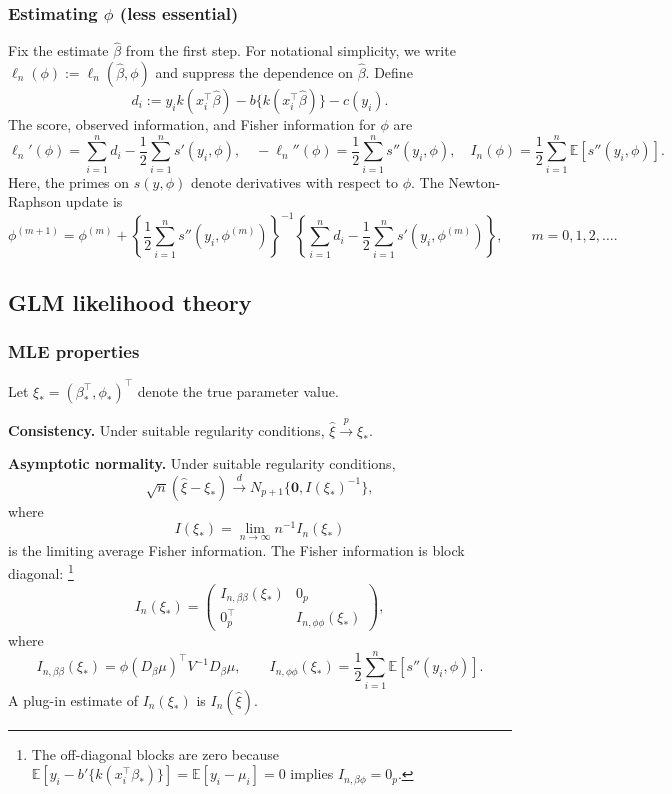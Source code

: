 \documentclass{article}
\theoremstyle{break}
\newcommand{\E}{\ensuremath{\mathbb{E}}}
\begin{document}
\subsubsection{Estimating $\phi$ (less essential)}
Fix the estimate $\hat\beta$ from the first step. 
For notational simplicity, we write $\ell_n(\phi):=\ell_n(\hat\beta,\phi)$ and suppress the dependence on $\hat\beta$. Define
\[
  d_i
  :=y_i k(x_i^\top\hat\beta)
  -b\{k(x_i^\top\hat\beta)\}
  -c(y_i).
\]
The score, observed information, and Fisher information for $\phi$ are
\[
  \ell_n'(\phi)
  =\sum_{i=1}^n d_i
  -\frac{1}{2}\sum_{i=1}^n s'(y_i,\phi), \quad
  -\ell_n''(\phi)
  =\frac{1}{2}\sum_{i=1}^n s''(y_i,\phi), \quad
  I_n(\phi)
  =\frac{1}{2}\sum_{i=1}^n
  \E[s''(y_i,\phi)].
\]
Here, the primes on $s(y,\phi)$ denote derivatives with respect to $\phi$. The Newton-Raphson update is
\[
  \phi^{(m+1)}
  =\phi^{(m)}
  +\left\{\frac{1}{2}\sum_{i=1}^n
  s''(y_i,\phi^{(m)})\right\}^{-1}
  \left\{\sum_{i=1}^n d_i
  -\frac{1}{2}\sum_{i=1}^n s'(y_i,\phi^{(m)})\right\},
  \qquad m=0,1,2,\ldots.
\]


\subsection{GLM likelihood theory}\label{sec:glm-likelihood-theory}
\subsubsection{MLE properties}
Let $\xi_*=(\beta_*^\top,\phi_*)^\top$ denote the true parameter value.

\textbf{Consistency.} Under suitable regularity conditions, $\hat\xi \stackrel{p}{\to} \xi_*$.

\textbf{Asymptotic normality.} Under suitable regularity conditions,
\[
  \sqrt{n}(\hat\xi-\xi_*)
  \xrightarrow{d}
  N_{p+1}\{\mathbf{0},I(\xi_*)^{-1}\},
\]
where
\[
  I(\xi_*)=\lim_{n\to\infty}n^{-1}I_n(\xi_*)
\]
is the limiting average Fisher information. The Fisher information is block diagonal:
\footnote{
    The off-diagonal blocks are zero because $\E[y_i - b'\{k(x_i^\top \beta_*)\}] = \E[y_i - \mu_i] = 0$ implies $I_{n, \beta\phi} = 0_p$.
}
\[
  I_n(\xi_*)=
  \begin{pmatrix}
    I_{n,\beta\beta}(\xi_*) & 0_p \\
    0_p^\top & I_{n,\phi\phi}(\xi_*)
  \end{pmatrix},
\]
where
\[
  I_{n,\beta\beta}(\xi_*) = \phi (D_\beta\mu)^\top V^{-1} D_\beta\mu,
  \qquad
  I_{n,\phi\phi}(\xi_*)
  =\frac{1}{2}\sum_{i=1}^n\E[s''(y_i,\phi)].
\]
A plug-in estimate of $I_n(\xi_*)$ is $I_n(\hat\xi)$.
\end{document}
